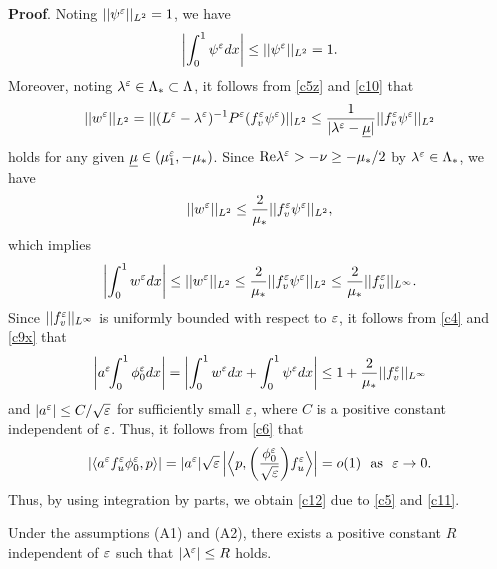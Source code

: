 \documentclass[a4,10pt]{article}
\begin{document}
{\bf Proof}. 
Noting $|| \psi^\varepsilon ||_{L^2} = 1$, we have
%
$$
\left| \int_0^1 \psi^\varepsilon dx \right| \leq || \psi^\varepsilon ||_{L^2} = 1.
$$
%
Moreover, noting $\lambda^\varepsilon \in \Lambda_* \subset \Lambda$, it follows from \eqref{c5z} and
\eqref{c10} that
%
$$
 || w^\varepsilon ||_{L^2}  
= || ( L^\varepsilon - \lambda^\varepsilon )^{-1} P^\varepsilon(f_v^\varepsilon \psi^\varepsilon)||_{L^2} 
\leq \displaystyle\frac{1}{|\lambda^\varepsilon - \underline{\mu}|} ||f_v^\varepsilon \psi^\varepsilon||_{L^2}
$$
%
holds for any given $\underline{\mu} \in ( \mu_1^\varepsilon, -\mu_*)$.
Since $\text{Re}\lambda^\varepsilon > - \nu \geq -\mu_*/2$ by 
$\lambda^\varepsilon \in \Lambda_*$, we have
%
$$
|| w^\varepsilon ||_{L^2} \leq  \frac{2}{\mu_*} || f^\varepsilon_v \psi^\varepsilon ||_{L^2},
$$
%
which implies
%
$$
\left| \int_0^1 w^\varepsilon dx \right| \leq  || w^\varepsilon ||_{L^2} \leq \frac{2}{\mu_*} || f^\varepsilon_v \psi^\varepsilon ||_{L^2} 
\leq \frac{2}{\mu_*} || f^\varepsilon_v ||_{L^\infty}.
$$
%
Since $||f^\varepsilon_v||_{L^\infty}$ is uniformly bounded with respect to $\varepsilon$, it follows from \eqref{c4} and \eqref{c9x} that
%
$$
\left| a^\varepsilon \! \! \int_0^1 \phi_0^\varepsilon dx \right| = \left| \int_0^1 w^\varepsilon dx  +   \int_0^1 \psi^\varepsilon dx \right| \leq 
1 + \frac{2}{\mu_*} || f^\varepsilon_v ||_{L^\infty} 
$$
%
and $| a^\varepsilon | \leq C/\sqrt{\varepsilon}$ for sufficiently small $\varepsilon$, where $C$ is a positive constant independent of $\varepsilon$.
Thus, it follows from \eqref{c6} that 
%
$$
| \langle a^\varepsilon f_u^\varepsilon \phi^\varepsilon_0, p \rangle | = 
| a^\varepsilon |  \sqrt{\varepsilon} \, \Big{|} \Big{\langle} p, \left(\frac{\phi_0^\varepsilon}{\sqrt{\varepsilon}} \right) \! f_u^\varepsilon \Big{\rangle} \Big{|} = o(1) 
\ \ \text{as} \ \ \varepsilon \to 0.
$$
%
Thus, by using integration by parts, we obtain \eqref{c12} due to \eqref{c5} and \eqref{c11}. \Qed


\begin{lemma}\label{lem2c}
Under the assumptions (A1) and (A2), there exists a positive constant
$R$ independent of $\varepsilon$ such that
$|\lambda^\varepsilon| \leq R$ holds.
\end{lemma}
\end{document}
